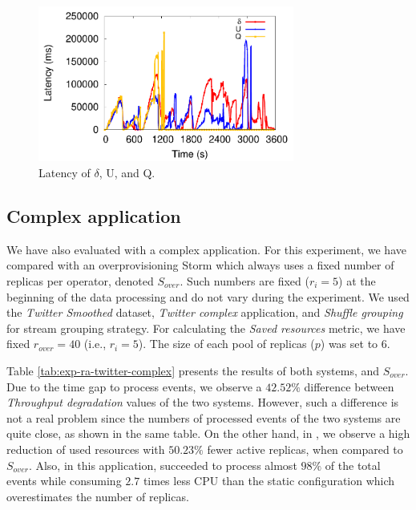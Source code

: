 \begin{figure}[!ht]
    \centering
    \includegraphics[width=0.75\textwidth]{figures/exp/reactive/TwitterLinear-Latency.pdf}
    \caption{Latency of $\delta$, U, and Q. }
    \label{fig:exp-ra-twitter-linear-latency}
\end{figure}


\subsection{Complex application}
\label{exp:ra-complex}
We have also evaluated \rSPS{} with a complex application. For this experiment, we have compared \rSPS{} with an overprovisioning Storm which always uses a fixed number of replicas per operator, denoted $S_{over}$. Such numbers are fixed ($r_i=5$) at the beginning of the data processing and do not vary during the experiment. We used the \textit{Twitter Smoothed} dataset, \textit{Twitter complex} application, and \textit{Shuffle grouping} for stream grouping strategy. For calculating the \textit{Saved resources} metric, we have fixed $r_{over} = 40$ (i.e., $r_i = 5$). The size of each pool of replicas ($p$) was set to 6.

Table \ref{tab:exp-ra-twitter-complex} presents the results of both systems, \rSPS{} and $S_{over}$. Due to the time gap to process events, we observe a $42.52\%$ difference between \textit{Throughput degradation} values of the two systems. However, such a difference is not a real problem since the numbers of processed events of the two systems are quite close, as shown in the same table.
On the other hand, in \rSPS{}, we observe a high reduction of used resources with $50.23\%$ fewer active replicas, when compared to $S_{over}$.
Also, in this application, \rSPS{} succeeded to process almost $98\%$ of the total events while consuming  $2.7$ times less CPU than the static configuration which overestimates the number of replicas.

